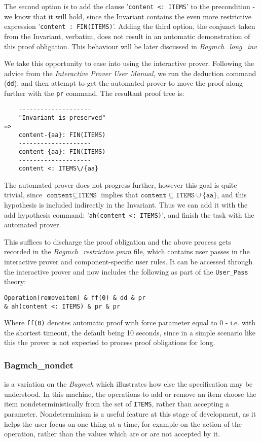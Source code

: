 \documentclass[11pt,journal]{IEEEtran}
\begin{document}
	The second option is to add the clause '\texttt{content <: ITEMS}' to the precondition - we know that it will hold, since the Invariant contains the even more restrictive expression '\texttt{content :  FIN(ITEMS)}'. Adding the third option, the conjunct taken from the Invariant, verbatim, does not result in an automatic demonstration of this proof obligation. This behaviour will be later discussed in \emph{Bagmch\_long\_inv}
	
	We take this opportunity to ease into using the interactive prover. Following the advice from the \emph{Interactive Prover User Manual}, we run the deduction command (\texttt{dd}), and then attempt to get the automated prover to move the proof along further with the \texttt{pr} command. The resultant proof tree is:
	
	\begin{lstlisting}
	--------------------
	"Invariant is preserved" 
=> 
	content-{aa}: FIN(ITEMS) 
	--------------------
	content-{aa}: FIN(ITEMS) 
	--------------------
	content <: ITEMS\/{aa} 
	\end{lstlisting}
	
	The automated prover does not progress further, however this goal is quite trivial, since $\texttt{content} \subseteq \texttt{ITEMS}$ implies that $\texttt{content} \subseteq \texttt{ITEMS} \cup \{\texttt{aa}\}$, and this hypothesis is included indirectly in the Invariant. Thus we can add it with the add hypothesis command: '\texttt{ah(content <: ITEMS)}', and finish the task with the automated prover. 
	
	This suffices to discharge the proof obligation and the above process gets recorded in the \emph{Bagmch\_restrictive.pmm} file, which contains user passes in the interactive prover and component-specific user rules. It can be accessed through the interactive prover and now includes the following as part of the \texttt{User\_Pass} theory:
	
	\begin{lstlisting}
Operation(removeitem) & ff(0) & dd & pr 
& ah(content <: ITEMS) & pr & pr
	\end{lstlisting}
	Where \texttt{ff(0)} denotes automatic proof with force parameter equal to 0 - i.e. with the shortest timeout, the default being 10 seconds, since in a simple scenario like this the prover is not expected to process proof obligations for long. 
	
	\subsubsection{Bagmch\_nondet} is a variation on the \emph{Bagmch} which illustrates how else the specification may be understood. In this machine, the operations to add or remove an item choose the item nondeterministically from the set of \texttt{ITEMS}, rather than accepting a parameter. Nondeterminism is a useful feature at this stage of development, as it helps the user focus on one thing at a time, for example on the action of the operation, rather than the values which are or are not accepted by it.
\end{document}
